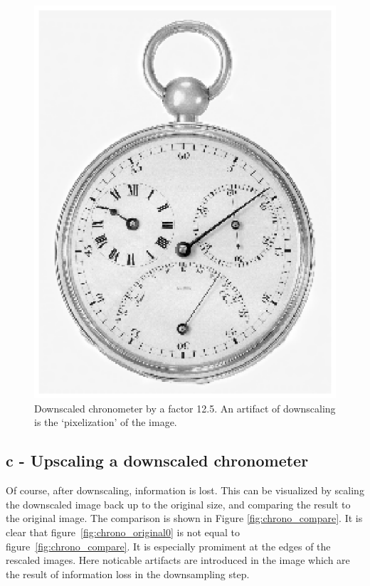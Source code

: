 \begin{figure}[!Htb]
 \centering
 \includegraphics{scaledDownChrono.eps}
 \caption{Downscaled chronometer by a factor 12.5. An artifact of downscaling is the `pixelization' of the image.}
 \label{fig:chrono_down}
\end{figure}

\clearpage

\subsection*{c - Upscaling a downscaled chronometer}
Of course, after downscaling, information is lost. This can be visualized by scaling the downscaled image back up to the original size, and comparing the result to the original image. The comparison is shown in Figure \ref{fig:chrono_compare}. It is clear that figure~\ref{fig:chrono_original0} is not equal to figure~\ref{fig:chrono_compare}. It is especially promiment at the edges of the rescaled images. Here noticable artifacts are introduced in the image which are the result of information loss in the downsampling step. 

